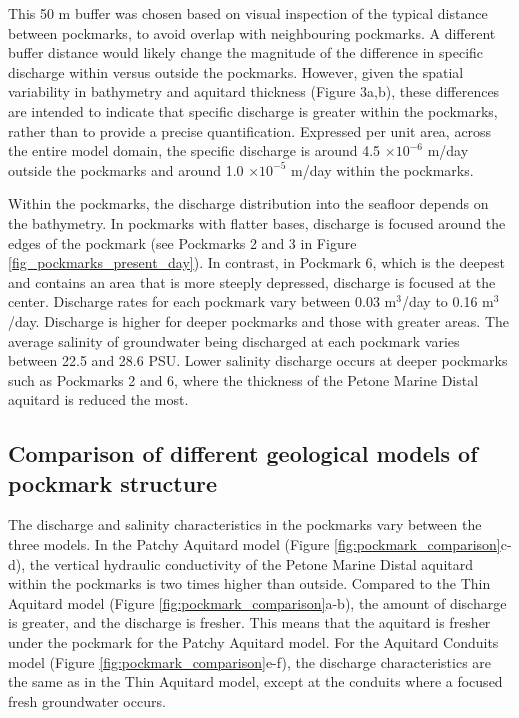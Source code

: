 \documentclass[pdflatex,sn-apa]{sn-jnl}%
\begin{document}
This 50 m buffer was chosen based on visual inspection of the typical distance between pockmarks, to avoid overlap with neighbouring pockmarks.
A different buffer distance would likely change the magnitude of the difference in specific discharge within versus outside the pockmarks.
However, given the spatial variability in bathymetry and aquitard thickness (Figure 3a,b), these differences are intended to
indicate that specific discharge is greater within the pockmarks, rather than to provide a precise quantification.
Expressed per unit area, across the entire model domain, the specific discharge is around 4.5 $\times 10^{-6}$ m/day outside the pockmarks and around 1.0 $\times 10^{-5}$ m/day within the pockmarks.

Within the pockmarks, the discharge distribution into the seafloor depends on the bathymetry.
In pockmarks with flatter bases, discharge is focused around the edges of the pockmark (see Pockmarks 2 and 3 in Figure \ref{fig_pockmarks_present_day}).
In contrast, in Pockmark 6, which is the deepest and contains an area that is more steeply depressed, discharge is focused at the center.
Discharge rates for each pockmark vary between 0.03 m$^3$/day to 0.16 m$^3$/day. Discharge is higher for deeper pockmarks and those with greater areas.
The average salinity of groundwater being discharged at each pockmark varies between 22.5 and 28.6 PSU.
Lower salinity discharge occurs at deeper pockmarks such as Pockmarks 2 and 6, where the thickness of the Petone Marine Distal aquitard is reduced the most.

\subsection{Comparison of different geological models of pockmark structure}
The discharge and salinity characteristics in the pockmarks vary between the three models.
In the Patchy Aquitard model (Figure \ref{fig:pockmark_comparison}c-d),
the vertical hydraulic conductivity of the Petone Marine Distal aquitard within the pockmarks is two times higher than outside.
Compared to the Thin Aquitard model (Figure \ref{fig:pockmark_comparison}a-b), the amount of discharge is greater, and the discharge is fresher.
This means that the aquitard is fresher under the pockmark for the Patchy Aquitard model.
For the Aquitard Conduits model (Figure \ref{fig:pockmark_comparison}e-f), the discharge characteristics are the same as in the Thin Aquitard model,
except at the conduits where a focused fresh groundwater occurs.
\end{document}
